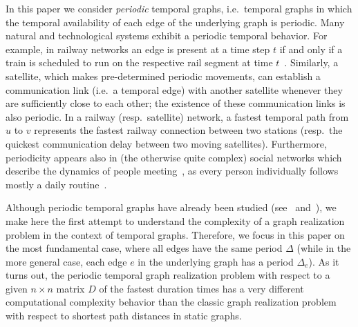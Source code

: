 \documentclass[a4paper,UKenglish,cleveref, autoref, thm-restate]{lipics-v2021}
\begin{document}
In this paper we consider \emph{periodic} temporal graphs, i.e.~temporal graphs in which the temporal availability of each edge of the underlying graph is periodic. 
Many natural and technological systems exhibit a periodic temporal behavior. For example, in railway networks an edge is present at a time step $t$ if and
only if a train is scheduled to run on the respective rail segment at time $t$~\cite{Arrighi2023Multi}. 
Similarly, a satellite, which makes pre-determined periodic movements, can establish a communication link (i.e.~a temporal edge) with another satellite whenever they are sufficiently close to each other; the existence of these communication links is also periodic. 
In a railway (resp.~satellite) network, a fastest temporal path from $u$ to $v$ represents the fastest railway connection between two stations 
(resp.~the quickest communication delay between two moving satellites). 
Furthermore, periodicity appears also in (the otherwise quite complex) social networks which describe the dynamics of people meeting~\cite{snapnets,sapiezynski2015tracking}, as every person individually follows mostly a daily routine~\cite{Arrighi2023Multi}. 


Although periodic temporal graphs have already been studied 
(see~\cite[Class 8]{casteigts2012time} and~\cite{Arrighi2023Multi,ErlebachS20,morawietz2021timecop,morawietz2020timecop}), 
we make here the first attempt to understand the complexity of a graph realization problem in the context of temporal graphs. 
Therefore, we focus in this paper on the most fundamental case, where all edges have the same period $\Delta$ 
(while in the more general case, each edge $e$ in the underlying graph has a period $\Delta_e$).
As it turns out, the periodic temporal graph realization problem with respect to a given $n \times n$ matrix $D$ of the fastest duration times has a very different computational complexity behavior than the classic graph realization problem with respect to shortest path distances in static graphs. 









\end{document}
